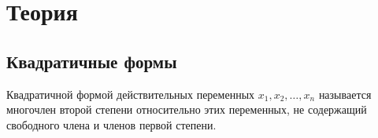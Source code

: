 %
%
%
%
%
%
%

\newpage

\section*{Теория}

\subsection{Квадратичные формы}

	Квадратичной формой действительных переменных $x_{1}, x_{2}, \ldots, x_{n}$ называется многочлен второй степени относительно этих переменных, не содержащий свободного члена и членов первой степени. \\

